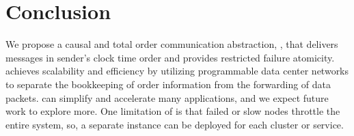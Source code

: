 \section{Conclusion}
\label{sec:conclusion}

We propose a causal and total order communication abstraction, \sys{}, that delivers messages in sender's clock time order and provides restricted failure atomicity. 
\sys{} achieves scalability and efficiency by utilizing programmable data center networks to separate the bookkeeping of order information from the forwarding of data packets.
\sys{} can simplify and accelerate many applications, and we expect future work to explore more. %
One limitation of \sys{} is that failed or slow nodes throttle the entire system, so, a separate \sys{} instance can be deployed for each cluster or service.
